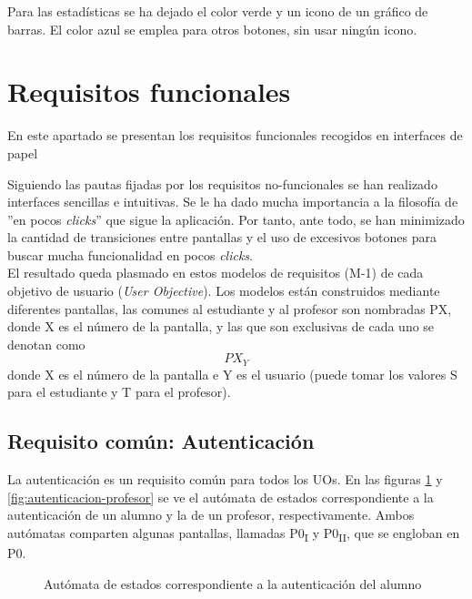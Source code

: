 Para las estadísticas se ha dejado el color verde y un icono de un gráfico de barras. El color azul se emplea para otros botones, sin usar ningún icono.\\

\section{Requisitos funcionales}
\label{analisis-de-requisitos:funcionales}

En este apartado se presentan los requisitos funcionales recogidos en interfaces de papel

Siguiendo las pautas fijadas por los requisitos no-funcionales se han realizado interfaces sencillas e intuitivas. Se le ha dado mucha importancia a la filosofía de ''en pocos \textit{clicks}'' que sigue la aplicación. Por tanto, ante todo, se han minimizado la cantidad de transiciones entre pantallas y el uso de excesivos botones para buscar mucha funcionalidad en pocos \textit{clicks}.\\

El resultado queda plasmado en estos modelos de requisitos (M-1) de cada objetivo de usuario (\textit{User Objective}). Los modelos están construidos mediante diferentes pantallas, las comunes al estudiante y al profesor son nombradas PX, donde X es el número de la pantalla, y las que son exclusivas de cada uno se denotan como \[PX_{Y}\]donde X es el número de la pantalla e Y es el usuario (puede tomar los valores S para el estudiante y T para el profesor).\\

\subsection{Requisito común: Autenticación}
\label{analisis-de-requisitos:funcionales:p1}

La autenticación es un requisito común para todos los UOs. En las figuras \ref{fig:autenticacion-alumno} y \ref{fig:autenticacion-profesor} se ve el autómata de estados correspondiente a la autenticación de un alumno y la de un profesor, respectivamente. Ambos autómatas comparten algunas pantallas, llamadas P0\textsubscript{I} y P0\textsubscript{II}, que se engloban en P0.\\

\noindent
\begin{figure}[!htbp]
\noindent
{}
\caption{Autómata de estados correspondiente a la autenticación del alumno}
\label{fig:autenticacion-alumno}
\end{figure}

